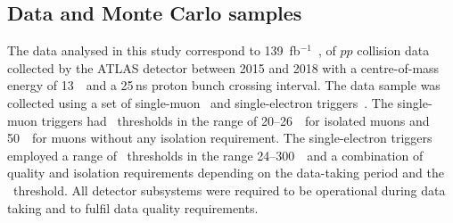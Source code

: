 \documentclass[letterpaper,12pt]{article}
\begin{document}
\subsection{Data and Monte Carlo samples}

\label{sec:samples}
The data analysed in this study correspond to 139~fb$^{-1}$~\cite{DAPR-2010-01,DAPR-2011-01,DAPR-2013-01,LUCID2}, 
of \(pp\) collision data collected by the ATLAS detector between 2015 and 2018
with a centre-of-mass energy of 13~\TeV\ and a 25\,ns proton bunch
crossing interval. 
The data sample was collected using a set of single-muon~\cite{Aad:2020uyd} 
and single-electron triggers~\cite{TRIG-2018-05}. The single-muon triggers 
had \pt\ thresholds in the range of 20--26~\GeV\ for 
isolated muons and 50~\GeV\ for muons without any isolation requirement. 
The single-electron triggers employed a range of \pt\ thresholds in the range 24--300~\GeV\ 
and a combination of quality and isolation requirements depending on the 
data-taking period and the \pt\ threshold.
All detector subsystems were required to be operational
during data taking and to fulfil data quality requirements.  

\end{document}
